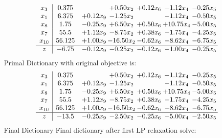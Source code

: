 \documentclass[8pt]{article}
\begin{document}
\[\begin{array}{c| c c@{\hskip 2pt} c@{\hskip 2pt} c@{\hskip 2pt} c@{\hskip 2pt} c@{\hskip 2pt} }
 x_{3}   &  0.375  &   & +  0.50 x_{2} & +  0.12 x_{6} & +  1.12 x_{4} & -0.25 x_{5}\\
 x_{1}   &  6.375 & +  0.12 x_{9} & -1.25 x_{2} &   & -1.12 x_{4} & -0.50 x_{5}\\
 x_{8}   &  1.75 & -0.25 x_{9} & +  6.50 x_{2} & +  0.50 x_{6} & + 10.75 x_{4} & -5.00 x_{5}\\
 x_{7}   &  55.5 & +  1.12 x_{9} & -8.75 x_{2} & +  0.38 x_{6} & -1.75 x_{4} & -4.25 x_{5}\\
 x_{10}   &  56.125 & +  1.00 x_{9} & -16.50 x_{2} & -0.62 x_{6} & -8.62 x_{4} & -6.75 x_{5}\\
\hline
z    &  -6.75 & -0.12 x_{9} & -0.25 x_{2} & -0.12 x_{6} & -1.00 x_{4} & -0.25 x_{5}\\
\end{array}\]
Primal Dictionary with original objective is:
\[\begin{array}{c| c c@{\hskip 2pt} c@{\hskip 2pt} c@{\hskip 2pt} c@{\hskip 2pt} c@{\hskip 2pt} }
 x_{3}   &  0.375  &   & +  0.50 x_{2} & +  0.12 x_{6} & +  1.12 x_{4} & -0.25 x_{5}\\
 x_{1}   &  6.375 & +  0.12 x_{9} & -1.25 x_{2} &   & -1.12 x_{4} & -0.50 x_{5}\\
 x_{8}   &  1.75 & -0.25 x_{9} & +  6.50 x_{2} & +  0.50 x_{6} & + 10.75 x_{4} & -5.00 x_{5}\\
 x_{7}   &  55.5 & +  1.12 x_{9} & -8.75 x_{2} & +  0.38 x_{6} & -1.75 x_{4} & -4.25 x_{5}\\
 x_{10}   &  56.125 & +  1.00 x_{9} & -16.50 x_{2} & -0.62 x_{6} & -8.62 x_{4} & -6.75 x_{5}\\
\hline
z    &  -13.5 & -0.25 x_{9} & -2.50 x_{2} & -0.25 x_{6} & -5.00 x_{4} & -2.50 x_{5}\\
\end{array}\]
Final Dictionary
Final dictionary after first LP relaxation solve: 
\end{document}
